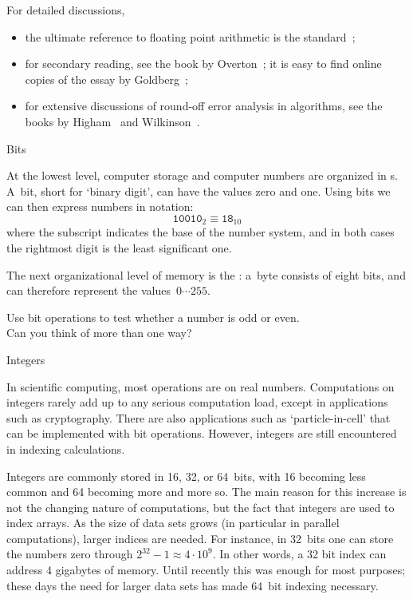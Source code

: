 For detailed discussions,
\begin{itemize}
\item the ultimate reference to floating point arithmetic
  is the  standard~\cite{754-2019};
\item for secondary reading,
  see the book by
  Overton~\cite{Overton:754book}; it is easy to find online copies of
  the essay by Goldberg~\cite{goldberg:floatingpoint};
\item for extensive
  discussions of round-off error analysis in algorithms, see the books
  by Higham~\cite{Higham:2002:ASN} and Wilkinson~\cite{Wilkinson:roundoff}.
\end{itemize}

 {Bits}
\label{sec:bits}

At the lowest level, computer storage and computer numbers
are organized in s.
A~bit, short for `binary digit', can have the values zero and one.
Using bits we can then express numbers in  notation:
\begin{equation}
  \mathtt{10010}_2 \equiv \mathtt{18}_{10}
\end{equation}
where the subscript indicates the base of the number system,
and in both cases the rightmost digit is the least significant one.

The next organizational level of memory is the :
a~byte consists of eight bits, and can therefore represent
the values~$0\cdots 255$.

\begin{exercise}
  \label{ex:bit-even}
  Use bit operations to test whether a number is odd or even.\\
  Can you think of more than one way?
\end{exercise}

 {Integers}

In scientific computing, most operations are on real
numbers. Computations on integers rarely add up to any serious
computation load, except in applications such as cryptography.
There are also applications such as `particle-in-cell' that
can be implemented with bit operations.
However, integers are still encountered in indexing calculations.

Integers are commonly stored in 16, 32, or 64~bits, with 16 becoming
less common and 64 becoming more and more so. The main reason for this increase is
not the changing nature of computations, but the fact that integers
are used to index arrays. As the size of data sets grows (in
particular in parallel computations), larger indices are needed. For
instance, in 32~bits one can store the numbers zero through
$2^{32}-1\approx 4\cdot 10^9$. In other words, a 32 bit index can
address 4 gigabytes of memory. Until recently this was enough for most
purposes; these days the need for larger data sets has made 64~bit
indexing necessary.


